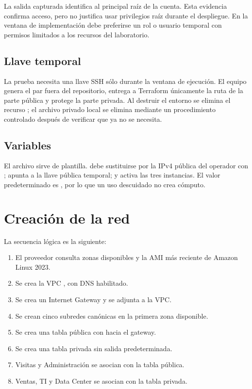 \begin{warningbox}
La salida capturada identifica al principal raíz de la cuenta. Esta evidencia confirma acceso, pero no justifica usar privilegios raíz durante el despliegue. En la ventana de implementación debe preferirse un rol o usuario temporal con permisos limitados a los recursos del laboratorio.
\end{warningbox}

\subsection{Llave temporal}

La prueba necesita una llave SSH sólo durante la ventana de ejecución. El equipo genera el par fuera del repositorio, entrega a Terraform únicamente la ruta de la parte pública y protege la parte privada. Al destruir el entorno se elimina el recurso ; el archivo privado local se elimina mediante un procedimiento controlado después de verificar que ya no se necesita.

\subsection{Variables}

El archivo  sirve de plantilla.  debe sustituirse por la IPv4 pública del operador con ;  apunta a la llave pública temporal; y  activa las tres instancias. El valor predeterminado es , por lo que un uso descuidado no crea cómputo.

\section{Creación de la red}

La secuencia lógica es la siguiente:

\begin{enumerate}
  \item El proveedor consulta zonas disponibles y la AMI más reciente de Amazon Linux 2023.
  \item Se crea la VPC , con DNS habilitado.
  \item Se crea un Internet Gateway y se adjunta a la VPC.
  \item Se crean cinco subredes canónicas en la primera zona disponible.
  \item Se crea una tabla pública con  hacia el gateway.
  \item Se crea una tabla privada sin salida predeterminada.
  \item Visitas y Administración se asocian con la tabla pública.
  \item Ventas, TI y Data Center se asocian con la tabla privada.
\end{enumerate}

